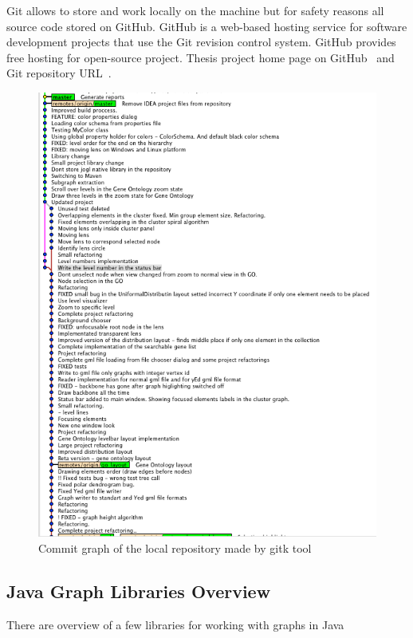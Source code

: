 Git allows to store and work locally on the machine but for safety reasons all source code stored on GitHub.
GitHub is a web-based hosting service for software development projects that use the Git revision control system.
GitHub provides free hosting for open-source project. Thesis project home page on GitHub~\cite{GitHub_homepage} and Git repository URL~\cite{GitHub_repository}.

\begin{figure}[h!]
\centering
\includegraphics[scale=0.62]{pictures/commit_graph_gitk.png}
\caption{Commit graph of the local repository made by gitk tool}
\end{figure}


\subsection{Java Graph Libraries Overview}


There are overview of a few libraries for working with graphs in Java

